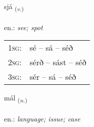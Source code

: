 \documentclass[frontgrid, backgrid]{flacards}\usepackage[]{graphicx}\usepackage[]{xcolor}
\begin{document}
{sjá \small{\textsubscript{(\textit{v.})}} \\[1ex] %
\textphonetic{[sjauː]} \\
en.: \emph{see; spot} \\  [2ex]
\renewcommand*{\arraystretch}{0.8}
\begin{tabular}{p{1cm}l}
\textsc{1sg}: & sé -- sá -- séð \\ 
\textsc{2sg}: & sérð -- sást -- séð \\ 
\textsc{3sg}: & sér -- sá -- séð \\ 
\end{tabular}
}

\renewcommand{\flhead}{\vskip5pt \fboxsep=0pt {\small\bfseries\footnotesize Nafnorð | Noun}}
\renewcommand{\fcfoot}{\vskip5pt \fboxsep=0pt \hspace{2pt}{\small\bfseries\footnotesize 1K}}

\renewcommand{\blhead}{\vskip5pt {\small\bfseries\footnotesize Nafnorð | Noun }}
\renewcommand{\bcfoot}{\vskip5pt \hspace{2pt}{\small\bfseries\footnotesize 1K}}


{mál \small{\textsubscript{(\textit{n.})}} \\[1ex] %
\textphonetic{[mauːl]} \\
en.: \emph{language; issue; case} \\  [2ex]
\renewcommand*{\arraystretch}{0.8}
}

\renewcommand{\flhead}{\vskip5pt \fboxsep=0pt {\small\bfseries\footnotesize Atviksorð | Adverb}}
\renewcommand{\fcfoot}{\vskip5pt \fboxsep=0pt \hspace{2pt}{\small\bfseries\footnotesize 1K}}

\renewcommand{\blhead}{\vskip5pt {\small\bfseries\footnotesize Atviksorð | Adverb }}
\renewcommand{\bcfoot}{\vskip5pt \hspace{2pt}{\small\bfseries\footnotesize 1K}}
\end{document}
